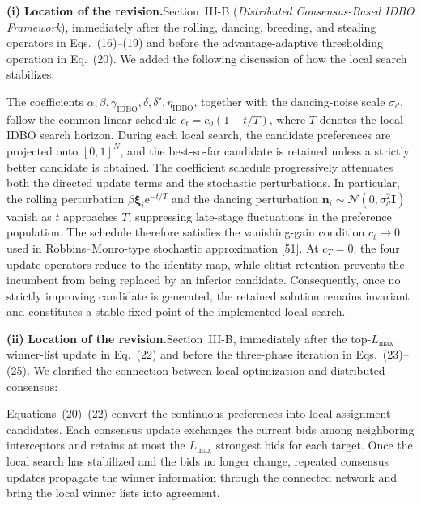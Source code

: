 \documentclass[11pt]{article}
\newcommand{\hladd}[1]{{\color{addblue}#1}}
\newcommand{\loc}{\medskip\noindent\textbf{Location of the revision.}\quad}
\begin{document}
\medskip
\noindent\textbf{(i)}
\loc Section~III-B (\emph{Distributed Consensus-Based IDBO Framework}),
immediately after the rolling, dancing, breeding, and stealing operators in
Eqs.~(16)--(19) and before the advantage-adaptive thresholding operation in
Eq.~(20). We added the following discussion of how the local search stabilizes:

\begin{tcolorbox}[enhanced,breakable,colback=white,colframe=addblue!55,
coltext=addblue,fontupper=\color{addblue},boxrule=0.6pt,arc=2pt,
left=9pt,right=9pt,top=7pt,bottom=7pt]
\hladd{The coefficients
$\alpha,\beta,\gamma_{\mathrm{IDBO}},\delta,\delta',
\eta_{\mathrm{IDBO}}$, together with the dancing-noise scale $\sigma_d$,
follow the common linear schedule $c_t=c_0(1-t/T)$, where $T$ denotes the
local IDBO search horizon. During each local search, the candidate
preferences are projected onto $[0,1]^N$, and the best-so-far candidate is
retained unless a strictly better candidate is obtained. The coefficient
schedule progressively attenuates both the directed update terms and the
stochastic perturbations. In particular, the rolling perturbation
$\beta\boldsymbol{\xi}_i\mathrm{e}^{-t/T}$ and the dancing perturbation
$\mathbf{n}_i\sim\mathcal{N}(0,\sigma_d^2\mathbf{I})$ vanish as $t$
approaches $T$, suppressing late-stage fluctuations in the preference
population. The schedule therefore satisfies the vanishing-gain condition
$c_t\to0$ used in Robbins--Monro-type stochastic approximation
[51]. At $c_T=0$, the four update operators reduce
to the identity map, while elitist retention prevents the incumbent from
being replaced by an inferior candidate. Consequently, once no strictly
improving candidate is generated, the retained solution remains invariant
and constitutes a stable fixed point of the implemented local search.}
\end{tcolorbox}

\medskip
\noindent\textbf{(ii)}
\loc Section~III-B, immediately after the top-$L_{\max}$ winner-list update
in Eq.~(22) and before the three-phase iteration in Eqs.~(23)--(25). 
We clarified the connection between local optimization and distributed consensus:

\begin{tcolorbox}[enhanced,breakable,colback=white,colframe=addblue!55,
boxrule=0.6pt,arc=2pt,left=9pt,right=9pt,top=7pt,bottom=7pt]
\hladd{Equations~(20)--(22) convert the continuous preferences into local
assignment candidates. Each consensus update exchanges the current bids
among neighboring interceptors and retains at most the $L_{\max}$ strongest
bids for each target. Once the local search has stabilized and the bids no
longer change, repeated consensus updates propagate the winner information
through the connected network and bring the local winner lists into
agreement.}
\end{tcolorbox}
\end{document}
